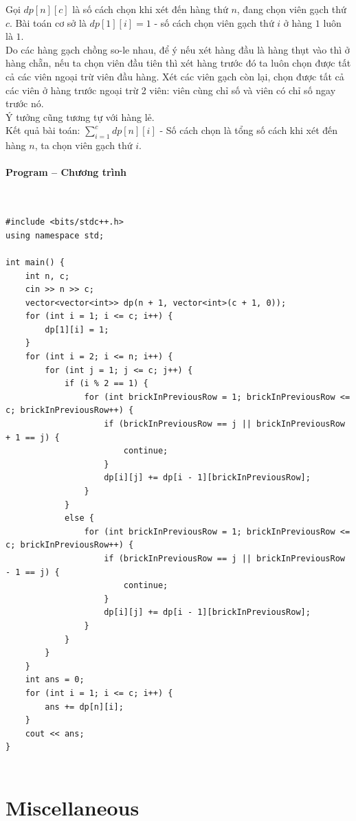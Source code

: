 \documentclass{article}
\begin{document}
Gọi $dp[n][c]$ là số cách chọn khi xét đến hàng thứ $n$, đang chọn viên gạch thứ $c$. Bài toán cơ sở là $dp[1][i] = 1$ - số cách chọn viên gạch thứ $i$ ở hàng $1$ luôn là $1$.\\

Do các hàng gạch chồng so-le nhau, để ý nếu xét hàng đầu là hàng thụt vào thì ở hàng chẵn, nếu ta chọn viên đầu tiên thì xét hàng trước đó ta luôn chọn được tất cả các viên ngoại trừ viên đầu hàng. Xét các viên gạch còn lại, chọn được tất cả các viên ở hàng trước ngoại trừ 2 viên: viên cùng chỉ số và viên có chỉ số ngay trước nó. \\

Ý tưởng cũng tương tự với hàng lẻ. \\

Kết quả bài toán: $\sum_{i =1}^{c}dp[n][i]$ - Số cách chọn là tổng số cách khi xét đến hàng $n$, ta chọn viên gạch thứ $i$.\\



\paragraph{Program -- Chương trình} \mbox{} \\


\begin{lstlisting}
#include <bits/stdc++.h>
using namespace std;

int main() {
	int n, c;
	cin >> n >> c;
	vector<vector<int>> dp(n + 1, vector<int>(c + 1, 0));
	for (int i = 1; i <= c; i++) {
		dp[1][i] = 1;
	}
	for (int i = 2; i <= n; i++) {
		for (int j = 1; j <= c; j++) {
			if (i % 2 == 1) {
				for (int brickInPreviousRow = 1; brickInPreviousRow <= c; brickInPreviousRow++) {
					if (brickInPreviousRow == j || brickInPreviousRow + 1 == j) {
						continue;
					}
					dp[i][j] += dp[i - 1][brickInPreviousRow];
				}
			}
			else {
				for (int brickInPreviousRow = 1; brickInPreviousRow <= c; brickInPreviousRow++) {
					if (brickInPreviousRow == j || brickInPreviousRow - 1 == j) {
						continue;
					}
					dp[i][j] += dp[i - 1][brickInPreviousRow];
				}
			}
		}
	}
	int ans = 0;
	for (int i = 1; i <= c; i++) {
		ans += dp[n][i];
	}
	cout << ans;
}
	
\end{lstlisting}

\section{Miscellaneous}
\end{document}
